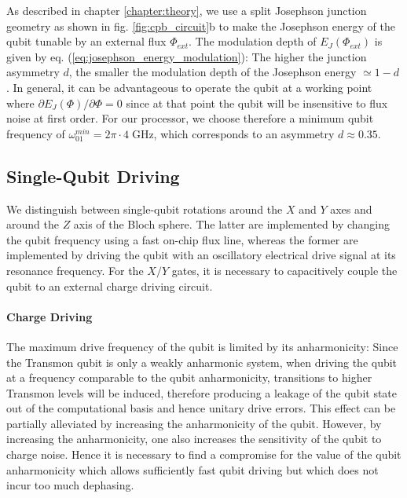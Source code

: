\smallskip

As described in chapter \ref{chapter:theory}, we use a split Josephson junction geometry as shown in fig. \ref{fig:cpb_circuit}b to make the Josephson energy of the qubit tunable by an external flux $\Phi_{ext}$. The modulation depth of $E_J(\Phi_{ext})$ is given by eq. (\ref{eq:josephson_energy_modulation}): The higher the junction asymmetry $d$, the smaller the modulation depth of the Josephson energy $\simeq 1-d$. In general, it can be advantageous to operate the qubit at a working point where $\partial E_J(\Phi)/\partial \Phi=0$ since at that point the qubit will be insensitive to flux noise at first order. For our processor, we choose therefore a minimum qubit frequency of $\omega_{01}^{min}=2\pi\cdot 4\;\mathrm{GHz}$, which corresponds to an asymmetry $d\approx 0.35$.

\subsection{Single-Qubit Driving} \label{section:qubit_driving}

We distinguish between single-qubit rotations around the $X$ and $Y$ axes and around the $Z$ axis of the Bloch sphere. The latter are implemented by changing the qubit frequency using a fast on-chip flux line, whereas the former are implemented by driving the qubit with an oscillatory electrical drive signal at its resonance frequency. For the $X/Y$ gates, it is necessary to capacitively couple the qubit to an external charge driving circuit. 

\paragraph{Charge Driving} 

The maximum drive frequency of the qubit is limited by its anharmonicity: Since the Transmon qubit is only a weakly anharmonic system, when driving the qubit at a frequency comparable to the qubit anharmonicity, transitions to higher Transmon levels will be induced, therefore producing a leakage of the qubit state out of the computational basis and hence unitary drive errors. This effect can be partially alleviated by increasing the anharmonicity of the qubit. However, by increasing the anharmonicity, one also increases the sensitivity of the qubit to charge noise. Hence it is necessary to find a compromise for the value of the qubit anharmonicity which allows sufficiently fast qubit driving but which does not incur too much dephasing.

